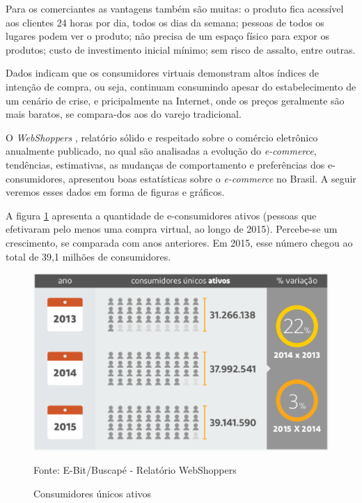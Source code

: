 \documentclass[a4paper,12pt]{monografia}
\begin{document}
Para os comerciantes as vantagens também são muitas: o produto fica acessível aos clientes 24 horas por dia, todos os dias da semana; pessoas de todos os lugares podem ver o produto; não precisa de um espaço físico para expor os produtos; custo de investimento inicial mínimo; sem risco de assalto, entre outras.

Dados indicam que os consumidores virtuais demonstram altos índices de intenção de compra, ou seja, continuam consumindo apesar do estabelecimento de um cenário de crise, e pricipalmente na Internet, onde os preços geralmente são mais baratos, se compara-dos aos do varejo tradicional.

O \textit{WebShoppers} , relatório sólido e respeitado sobre o comércio eletrônico anualmente publicado, no qual são analisadas a evolução do \textit{e-commerce}, tendências, estimativas, as mudanças de comportamento e preferências dos e-consumidores, apresentou boas estatísticas sobre o \textit{e-commerce} no Brasil. A seguir veremos esses dados em forma de figuras e gráficos.

A figura \ref{figura:consumidores} apresenta a quantidade de e-consumidores ativos (pessoas que efetivaram pelo
menos uma compra virtual, ao longo de 2015). Percebe-se um crescimento, se comparada com anos anteriores. Em 2015, esse número chegou ao total de 39,1 milhões de consumidores.

\begin{figure}[H]
\centering
\includegraphics[width=12cm]{img/webshoppers/consumidores.eps}
\caption{Consumidores únicos ativos}
\small{Fonte: E-Bit/Buscapé - Relatório WebShoppers}
\label{figura:consumidores}
\end{figure}
\end{document}
